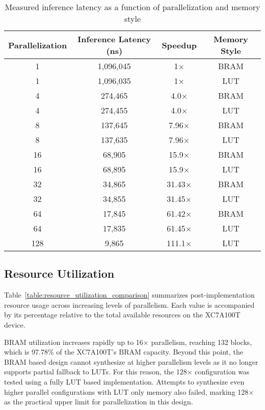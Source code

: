 \documentclass[a4paper,12pt]{report}
\begin{document}
\begin{table}[H]
\centering
\renewcommand{\arraystretch}{1.2}
\begin{tabular}{|c|c|c|c|}
\hline
\textbf{Parallelization} & \textbf{Inference Latency (ns)} & \textbf{Speedup} & \textbf{Memory Style} \\
    \hline
    1   & 1,096,045 & 1$\times$ & BRAM \\
    \hline
    1   & 1,096,035 & 1$\times$ & LUT \\
    \hline
    4   &   274,465 & 4.0$\times$ & BRAM \\
    \hline
    4   &   274,455 & 4.0$\times$ & LUT \\
    \hline
    8   &   137,645 & 7.96$\times$ & BRAM \\
    \hline
    8   &   137,635 & 7.96$\times$ & LUT \\
    \hline
    16  &    68,905 & 15.9$\times$ & BRAM \\
    \hline
    16  &    68,895 & 15.9$\times$ & LUT \\
    \hline
    32  &    34,865 & 31.43$\times$ & BRAM \\
    \hline
    32  &    34,855 & 31.45$\times$ & LUT \\
    \hline
    64  &    17,845 & 61.42$\times$ & BRAM \\
    \hline
    64  &    17,835 & 61.45$\times$ & LUT \\
    \hline
    128 &     9,865 & 111.1$\times$ & LUT \\
    \hline
\end{tabular}
\vspace{1em}
\caption{Measured inference latency as a function of parallelization and memory style}
\label{table:latency_comparison}
\end{table}


\subsection{Resource Utilization}
Table~\ref{table:resource_utilization_comparison} summarizes post-implementation resource usage across increasing levels of parallelism. Each value is accompanied by its percentage relative to the total available resources on the XC7A100T device.

BRAM utilization increases rapidly up to 16$\times$ parallelism, reaching 132 blocks, which is 97.78\% of the XC7A100T’s BRAM capacity. Beyond this point, the BRAM based design cannot synthesize at higher parallelism levels as it no longer supports partial fallback to LUTs. For this reason, the 128$\times$ configuration was tested using a fully LUT based implementation. Attempts to synthesize even higher parallel configurations with LUT only memory also failed, marking 128$\times$ as the practical upper limit for parallelization in this design.
\end{document}
